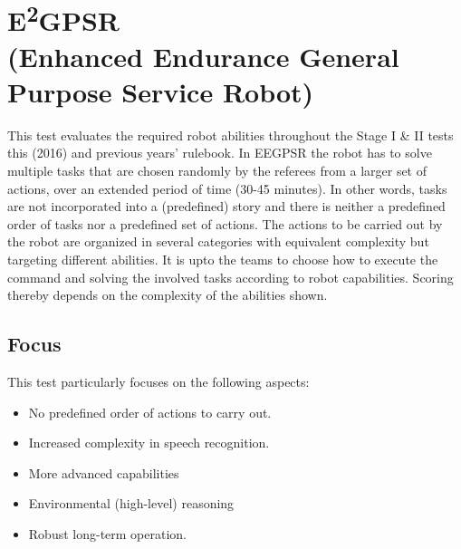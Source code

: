 %
%

\newcommand{\eegpsrTeams}{2~}
\newcommand{\eegpsrMaxCmd}{3~}
\newcommand{\eegpsrMaxCmdTime}{5~}
\newcommand{\eegpsrMaxTeamTime}{\eegpsrMaxCmd$\times$\eegpsrMaxCmdTime}

\section[EEGPSR]{E\textsuperscript{2}GPSR \\ \normalsize{(Enhanced Endurance General Purpose Service Robot)}}
\label{sec:eegpsr}

This test evaluates the required robot abilities throughout the Stage I \& II tests this (2016) and previous years' rulebook. In EEGPSR the robot has to solve multiple tasks that are chosen randomly by the referees from a larger set of actions, over an extended period of time (30-45 minutes). In other words, tasks are not incorporated into a (predefined) story and there is neither a predefined order of tasks nor a predefined set of actions.
The actions to be carried out by the robot are organized in several categories with equivalent complexity but targeting different abilities.
It is upto the teams to choose how to execute the command and solving the involved tasks according to robot capabilities.
Scoring thereby depends on the complexity of the abilities shown.

\subsection{Focus}
This test particularly focuses on the following aspects:
\begin{itemize}
	\item No predefined order of actions to carry out.
	\item Increased complexity in speech recognition.
	\item More advanced capabilities
	\item Environmental (high-level) reasoning
	\item Robust long-term operation.

\end{itemize}

